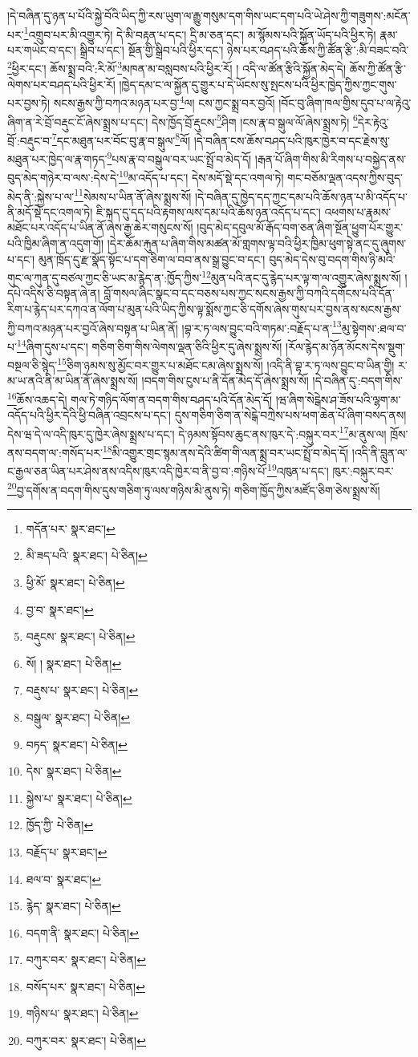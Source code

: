 །དེ་བཞིན་དུ་ཉན་པ་པོའི་སྐྱེ་བོའི་ཡིད་ཀྱི་རས་ཡུག་ལ་རྒྱུ་གསུམ་དག་གིས་ཡང་དག་པའི་ཡེ་ཤེས་ཀྱི་གཟུགས་:མངོན་པར་\footnote{གདོན་པར་  སྣར་ཐང་། }འགྲུབ་པར་མི་འགྱུར་ཏེ། དེ་མི་བརྟན་པ་དང་། དྲི་མ་ཅན་དང་། མ་སྙོམས་པའི་སྐྱོན་ཡོད་པའི་ཕྱིར་ཏེ། རྣམ་པར་གཡེང་བ་དང་། སྒྲིབ་པ་དང་། སྔོན་གྱི་སྒྲིབ་པའི་ཕྱིར་དང་། ཉེས་པར་བཤད་པའི་ཆོས་ཀྱི་ཚོན་རྩི་:མི་བཟང་བའི་\footnote{མི་ཟད་པའི་  སྣར་ཐང་།  པེ་ཅིན། }ཕྱིར་དང་། ཆོས་སྨྲ་བའི་:རི་མོ་\footnote{ཕྱི་མོ་  སྣར་ཐང་།  པེ་ཅིན། }མཁན་མ་བསླབས་པའི་ཕྱིར་རོ། །
འདི་ལ་ཚོན་རྩིའི་སྐྱོན་མེད་དེ། ཆོས་ཀྱི་ཚོན་རྩི་ལེགས་པར་བཤད་པའི་ཕྱིར་རོ། །ཁྱེད་དམ་ང་ལ་སྐྱོན་དུ་གྱུར་པ་དེ་ཡོངས་སུ་སྤངས་པའི་ཕྱིར་ཁྱེད་ཀྱིས་ཀྱང་གུས་པར་བྱས་ཏེ། སངས་རྒྱས་ཀྱི་བཀའ་མཉན་པར་བྱ་\footnote{བྱ་བ་  སྣར་ཐང་། }ལ། ངས་ཀྱང་སྨྲ་བར་བྱའོ། །བོང་བུ་ཞིག་ཁལ་གྱིས་དུབ་པ་ལ་རྟེའུ་ཞིག་ན་རེ་བྲོ་བརྡུང་ངོ་ཞེས་སྨྲས་པ་དང་། དེས་ཁྱོད་བྲོ་རྡུངས་\footnote{བརྡུངས་  སྣར་ཐང་།  པེ་ཅིན། }ཤིག །ངས་རྣ་བ་སྒུལ་ལོ་ཞེས་སྨྲས་ཏེ། \footnote{སོ། །   སྣར་ཐང་།  པེ་ཅིན། }དེར་རྟེའུ་བྲོ་:བརྡུང་བ་\footnote{བརྡུས་པ་  སྣར་ཐང་།  པེ་ཅིན། }དང་མཐུན་པར་བོང་བུ་རྣ་བ་སྒུལ་\footnote{བསྒུལ་  སྣར་ཐང་།  པེ་ཅིན། }ལོ། །དེ་བཞིན་ངས་ཆོས་བཤད་པའི་ཁུར་ཁྱེར་བ་དང་རྗེས་སུ་མཐུན་པར་ཁྱེད་ལ་རྣ་གཏད་\footnote{བཏད་  སྣར་ཐང་།  པེ་ཅིན། }པས་རྣ་བ་བསྒུལ་བར་ཡང་སྤྲོ་བ་མེད་དོ། །རྒན་པོ་ཞིག་གིས་མི་རིགས་པ་བསྐྱེད་ནས་བུད་མེད་གཉེར་བ་ལས་:དེས་དེ་\footnote{དེས་  སྣར་ཐང་།  པེ་ཅིན། }མ་འདོད་པ་དང་། དེས་མདོ་སྡེ་དང་འགལ་ཏེ། གང་བཅོམ་ལྡན་འདས་ཀྱིས་བུད་མེད་ནི་:སྐྱེས་པ་ལ་\footnote{སྐྱེས་པ་  སྣར་ཐང་།  པེ་ཅིན། }སེམས་པ་ཡིན་ནོ་ཞེས་སྨྲས་སོ། །དེ་བཞིན་དུ་ཁྱེད་དད་ཀྱང་དམ་པའི་ཆོས་ཉན་པ་མི་འདོད་པ་ནི་མདོ་སྡེ་དང་འགལ་ཏེ། ཇི་སྐད་དུ་དད་པའི་རྟགས་ལས་དམ་པའི་ཆོས་ཉན་འདོད་པ་དང་། འཕགས་པ་རྣམས་མཐོང་པར་འདོད་པ་ཡིན་ནོ་ཞེས་རྒྱ་ཆེར་གསུངས་སོ། །བུད་མེད་དབུལ་མོ་རྒོད་བག་ཅན་ཞིག་སྔོན་ཕྱུག་པོར་གྱུར་པའི་ཁྱིམ་ཞིག་ན་འདུག་གོ། །དེར་ཆོམ་རྐུན་པ་ཞིག་གིས་མཚན་མོ་གླགས་ལྟ་བའི་ཕྱིར་ཁྱིམ་ཕུག་སྟེ་ནང་དུ་ཞུགས་པ་དང་། མུན་ཁྲོད་དུ་རྫ་སྣོད་སྟོང་པ་དག་ཅིག་ལ་བབ་ནས་སྒྲ་བྱུང་བ་དང་། བུད་མེད་དེས་བུ་བདག་གིས་ཉི་མའི་གུང་ལ་ཀུན་དུ་བཙལ་ཀྱང་ཅི་ཡང་མ་རྙེད་ན་:ཁྱོད་ཀྱིས་\footnote{ཁྱོད་ཀྱི་  པེ་ཅིན། }མུན་པའི་ནང་དུ་རྙེད་པར་ལྟ་ག་ལ་འགྱུར་ཞེས་སྨྲས་སོ། །དཔེ་འདིས་ཅི་བསྟན་ཞེ་ན། བློ་གསལ་ཞིང་སྣང་བ་དང་བཅས་པས་ཀྱང་སངས་རྒྱས་ཀྱི་བཀའི་དགོངས་པའི་དོན་རིག་པ་རྙེད་པར་དཀའ་ན་ལོག་པ་མུན་པའི་ཡིད་ཀྱིས་ལྟ་སྨོས་ཀྱང་ཅི་དགོས་ཞེས་གུས་པར་བྱས་ནས་སངས་རྒྱས་ཀྱི་བཀའ་མཉན་པར་བྱའོ་ཞེས་བསྟན་པ་ཡིན་ནོ། །བྷ་ར་ཏ་ལས་བྱུང་བའི་གཏམ་:བརྗོད་པ་ན་\footnote{བརྗོད་པ་  སྣར་ཐང་། }མུ་སྟེགས་:ཐལ་བ་པ་\footnote{ཐལ་བ་  སྣར་ཐང་། }ཞིག་དུས་པ་དང་། གཅིག་ཅིག་གིས་ལེགས་ལྡན་ཅིའི་ཕྱིར་དུ་ཞེས་སྨྲས་སོ། །རོལ་རྙེད་མ་ཉོན་མོངས་དེས་སྡུག་བསྔལ་ཅི་སྙེད་\footnote{རྙེད་  སྣར་ཐང་།  པེ་ཅིན། }ཅིག་ཉམས་སུ་མྱོང་བར་གྱུར་པ་མཐོང་ངམ་ཞེས་སྨྲས་སོ། །འདི་ནི་བྷ་ར་ཏ་ལས་བྱུང་བ་ཡིན་གྱི། ར་མ་ཡ་ནའི་ནི་མ་ཡིན་ནོ་ཞེས་སྨྲས་སོ། །བདག་གིས་ངུས་པ་ནི་དོན་མེད་དོ་ཞེས་སྨྲས་སོ། །དེ་བཞིན་དུ་:བདག་གིས་\footnote{བདག་ནི་  སྣར་ཐང་།  པེ་ཅིན། }ཆོས་འཆད་དེ། གལ་ཏེ་གཉིད་ལོག་ན་བདག་གིས་བཤད་པའི་དོན་མེད་དོ། །ཝ་ཞིག་སེངྒེས་ཤ་ཟོས་པའི་ལྷག་མ་འདོད་པའི་ཕྱིར་དེའི་ཕྱི་བཞིན་འབྲངས་པ་དང་། དུས་གཅིག་ཅིག་ན་སེངྒེ་བཀྲེས་པས་ཕག་ཆེན་པོ་ཞིག་བསད་ནས། དེས་ཝ་དེ་ལ་འདི་ཁུར་དུ་ཁྱེར་ཞེས་སྨྲས་པ་དང་། དེ་ཉམས་སྟོབས་ཆུང་ནས་ཁུར་དེ་:བསྐུར་བར་\footnote{བཀུར་བར་  སྣར་ཐང་།  པེ་ཅིན། }མ་ནུས་ལ། ཁྲོས་ནས་བདག་ལ་:གསོད་པར་\footnote{བསོད་པར་  སྣར་ཐང་།  པེ་ཅིན། }མི་འགྱུར་གྲང་སྙམ་ནས་དེའི་ཚིག་གི་ལན་སྨྲ་བར་ཡང་སྤྲོ་བ་མེད་དོ། །འདི་ནི་བླུན་ལ་ང་རྒྱལ་ཅན་ཡིན་པར་ཤེས་ནས་འདིས་ཁུར་འདི་ཁྱེར་བ་ནི་བྱ་བ་:གཉིས་པོ་\footnote{གཉིས་པ་  སྣར་ཐང་།  པེ་ཅིན། }འཁུན་པ་དང་། ཁུར་:བསྐུར་བར་\footnote{བཀུར་བར་  སྣར་ཐང་།  པེ་ཅིན། }བྱ་དགོས་ན་བདག་གིས་དུས་གཅིག་ཏུ་ལས་གཉིས་མི་ནུས་ཏེ། གཅིག་ཁྱོད་ཀྱིས་མཛོད་ཅིག་ཅེས་སྨྲས་སོ། 